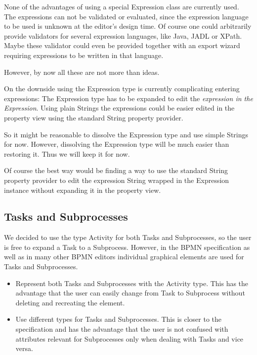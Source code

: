None of the advantages of using a special Expression class are currently used. The expressions can not be validated or evaluated, since the expression language to be used is unknown at the editor's design time. Of course one could arbitrarily provide validators for several expression languages, like Java, JADL or XPath. Maybe these validator could even be provided together with an export wizard requiring expressions to be written in that language.

However, by now all these are not more than ideas.

On the downside using the Expression type is currently complicating entering expressions: The Expression type has to be expanded to edit the \emph{expression in the Expression}. Using plain Strings the expressions could be easier edited in the property view using the standard String property provider.

So it might be reasonable to dissolve the Expression type and use simple Strings for now. However, dissolving the Expression type will be much easier than restoring it. Thus we will keep it for now.

Of course the best way would be finding a way to use the standard String property provider to edit the expression String wrapped in the Expression instance without expanding it in the property view.


\subsection{Tasks and Subprocesses}

We decided to use the type Activity for both Tasks and Subprocesses, so the user is free to expand a Task to a Subprocess. However, in the BPMN specification as well as in many other BPMN editors individual graphical elements are used for Tasks and Subprocesses.

\begin{itemize}
        \item Represent both Tasks and Subprocesses with the Activity type. This has the advantage that the user can easily change from Task to Subprocess without deleting and recreating the element.
        \item Use different types for Tasks and Subprocesses. This is closer to the specification and has the advantage that the user is not confused with attributes relevant for Subprocesses only when dealing with Tasks and vice versa.
\end{itemize}

